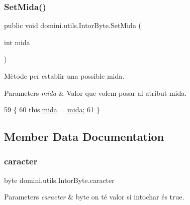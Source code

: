 \subsubsection{\texorpdfstring{Set\+Mida()}{SetMida()}}
{\footnotesize\ttfamily public void domini.\+utils.\+Intor\+Byte.\+Set\+Mida (\begin{DoxyParamCaption}\item[{int}]{mida }\end{DoxyParamCaption})\hspace{0.3cm}{\ttfamily [inline]}}



Mètode per establir una possible mida. 


\begin{DoxyParams}{Parameters}
{\em mida} & Valor que volem posar al atribut mida. \\
\hline
\end{DoxyParams}

\begin{DoxyCode}
59    \{
60       this.\hyperlink{classdomini_1_1utils_1_1IntorByte_a6dd2ad21efcfb2bcfff716f5e04794d9}{mida} = \hyperlink{classdomini_1_1utils_1_1IntorByte_a6dd2ad21efcfb2bcfff716f5e04794d9}{mida};
61    \}
\end{DoxyCode}


\subsection{Member Data Documentation}
\mbox{\label{classdomini_1_1utils_1_1IntorByte_adbb2e8c31ead2f27d85ff39683b9a8a7}} 
\subsubsection{\texorpdfstring{caracter}{caracter}}
{\footnotesize\ttfamily byte domini.\+utils.\+Intor\+Byte.\+caracter\hspace{0.3cm}{\ttfamily [private]}}


\begin{DoxyParams}{Parameters}
{\em caracter} & byte on té valor si intochar és true. \\
\hline
\end{DoxyParams}
\mbox{\label{classdomini_1_1utils_1_1IntorByte_a83872b8acc9ab187acbc2175d5bf320e}} 
